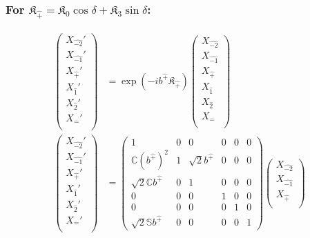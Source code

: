 \documentclass[]{article}
\numberwithin{equation}{section}
\begin{document}
{{\subsubsection{For $\mathfrak{K}_{\hat{+}}=\mathfrak{K}_0\cos{\delta}+\mathfrak{K}_3\sin{\delta}$:}
\begin{align}
\begin{pmatrix}
    {X}_{\hat{-2}}'\\
    {X}_{\hat{-1}}'\\
    {X}_{\hat{+}}'\\
    {X}_{\hat{1}}'\\
    {X}_{\hat{2}}'\\
    {X}_{\hat{-}}'\\
    \end{pmatrix}&= \exp{(-ib^{\hat{+}}\mathfrak{K}_{\hat{+}})}\begin{pmatrix}
    {X}_{\hat{-2}}\\
    {X}_{\hat{-1}}\\
    {X}_{\hat{+}}\\
    {X}_{\hat{1}}\\
    {X}_{\hat{2}}\\
    {X}_{\hat{-}}\\
    \end{pmatrix}\\
    \begin{pmatrix}
    {X}_{\hat{-2}}'\\
    {X}_{\hat{-1}}'\\
    {X}_{\hat{+}}'\\
    {X}_{\hat{1}}'\\
    {X}_{\hat{2}}'\\
    {X}_{\hat{-}}'\\
    \end{pmatrix}&= \begin{pmatrix}
        1&0&0&0&0&0\\
        \mathbb{C}(b^{\hat{+}})^2&1&\sqrt{2}b^{\hat{+}}&0&0&0\\
        \sqrt{2}\mathbb{C}b^{\hat{+}}&0&1&0&0&0\\
        0&0&0&1&0&0\\
        0&0&0&0&1&0\\
        \sqrt{2}\mathbb{S}b^{\hat{+}}&0&0&0&0&1
    \end{pmatrix}\begin{pmatrix}
    {X}_{\hat{-2}}\\
    {X}_{\hat{-1}}\\
    {X}_{\hat{+}}\\

\end{pmatrix}
\end{align}}}
\end{document}
